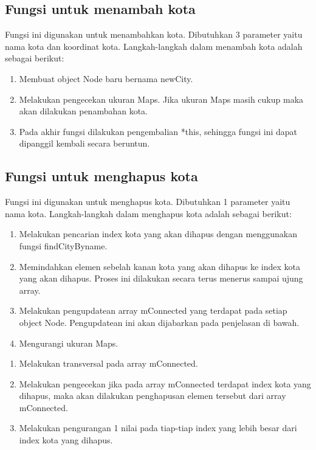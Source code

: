 \documentclass[]{article}
\begin{document}
\subsection{Fungsi untuk menambah kota}

\par
Fungsi ini digunakan untuk menambahkan kota. Dibutuhkan 3 parameter yaitu nama kota dan koordinat kota. Langkah-langkah dalam menambah kota adalah sebagai berikut:
\begin{enumerate}
    \item Membuat object Node baru bernama newCity.
    \item Melakukan pengecekan ukuran Maps. Jika ukuran Maps masih cukup maka akan dilakukan penambahan kota.
    \item Pada akhir fungsi dilakukan pengembalian *this, sehingga fungsi ini dapat dipanggil kembali secara beruntun.
\end{enumerate}
\subsection{Fungsi untuk menghapus kota}

\par
Fungsi ini digunakan untuk menghapus kota. Dibutuhkan 1 parameter yaitu nama kota. Langkah-langkah dalam menghapus kota adalah sebagai berikut:
\begin{enumerate}
    \item Melakukan pencarian index kota yang akan dihapus dengan menggunakan fungsi findCityByname.
    \item Memindahkan elemen sebelah kanan kota yang akan dihapus ke index kota yang akan dihapus. Proses ini dilakukan secara terus menerus sampai ujung array.
    \item Melakukan pengupdatean array mConnected yang terdapat pada setiap object Node. Pengupdatean ini akan dijabarkan pada penjelasan di bawah.
    \item Mengurangi ukuran Maps.
\end{enumerate}

\begin{enumerate}
    \item Melakukan transversal pada array mConnected.
    \item Melakukan pengecekan jika pada array mConnected terdapat index kota yang dihapus, maka akan dilakukan penghapusan elemen tersebut dari array mConnected.
    \item Melakukan pengurangan 1 nilai pada tiap-tiap index yang lebih besar dari index kota yang dihapus.
\end{enumerate}
\end{document}
